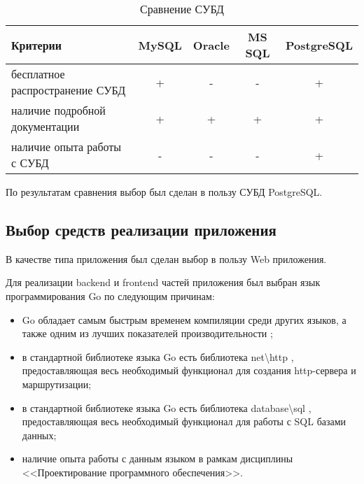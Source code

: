 \begin{table}[!h]
	\begin{center}
		\begin{threeparttable}
			\caption{Сравнение СУБД}
			\label{tbl:cmp_dbms}
			\begin{tabular}{|p{7cm}|c|c|c|c|}
				\hline
				\textbf{Критерии} & MySQL & Oracle & MS SQL & PostgreSQL \\
				\hline
				бесплатное распространение СУБД & + & - & - & + \\
				\hline
				наличие подробной документации & + & + & + & + \\
				\hline
				наличие опыта работы с СУБД & - & - & -  & + \\
				\hline
			\end{tabular}
		\end{threeparttable}			
	\end{center}
\end{table}

По результатам сравнения выбор был сделан в пользу СУБД PostgreSQL.

\subsection{Выбор средств реализации приложения}

В качестве типа приложения был сделан выбор в пользу Web приложения.

Для реализации backend и frontend частей приложения был выбран язык программирования Go \cite{info_go} по следующим причинам: 

\begin{itemize}
	\item Go обладает самым быстрым временем компиляции среди других языков, а также одним из лучших показателей производительности \cite{info_cmp_go, info_cmp_go_2};
	\item в стандартной библиотеке языка Go есть библиотека net\textbackslash http \cite{info_go_http_pkg}, предоставляющая весь необходимый функционал для создания http-сервера и маршрутизации;
	\item в стандартной библиотеке языка Go есть библиотека database\textbackslash sql \cite{info_go_sql_pkg}, предоставляющая весь необходимый функционал для работы с SQL базами данных;
	\item наличие опыта работы с данным языком в рамкам дисциплины <<Проектирование программного обеспечения>>.
\end{itemize}

